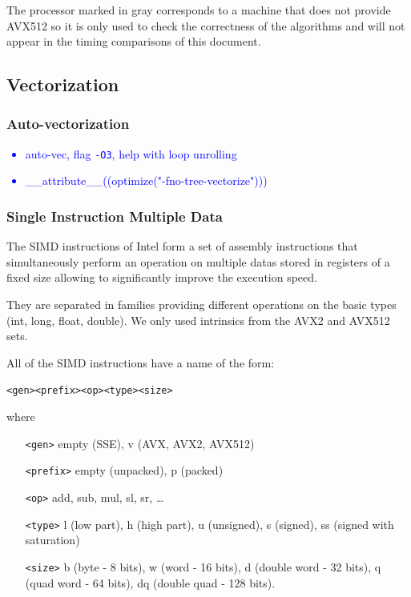 \documentclass[a4paper]{article}
\begin{document}
\bigskip
The processor marked in gray corresponds to a machine that does not provide AVX512 so it is only used to check the
correctness of the algorithms and will not appear in the timing comparisons of this document.

\subsection{Vectorization}

\subsubsection{Auto-vectorization}

\textcolor{blue}{
\begin{itemize}
    \item auto-vec, flag \texttt{-O3}, help with loop unrolling
    \item \_\_attribute\_\_((optimize("-fno-tree-vectorize")))
\end{itemize}}

\subsubsection{Single Instruction Multiple Data}

The SIMD instructions of Intel form a set of assembly instructions that simultaneously perform an operation on multiple datas stored in registers
of a fixed size allowing to significantly improve the execution speed.

They are separated in families providing different operations on the basic types (int, long, float, double). We only used intrinsics from
the AVX2 and AVX512 sets.

\bigskip
All of the SIMD instructions have a name of the form:
\begin{center} 
    \texttt{<gen><prefix><op><type><size>}
\end{center}

where
\begin{center}
    \begin{minipage}{12cm}
        \begin{itemize}
            \item[\texttt{<gen>}] empty (SSE), v (AVX, AVX2, AVX512)
            \item[\texttt{<prefix>}] empty (unpacked), p (packed)
            \item[\texttt{<op>}] add, sub, mul, sl, sr, \dots
            \item[\texttt{<type>}] l (low part), h (high part), u (unsigned), s (signed), ss (signed with saturation)
            \item[\texttt{<size>}] b (byte - 8 bits), w (word - 16 bits), d (double word - 32 bits), q (quad word - 64 bits), 
            dq (double quad - 128 bits).
        \end{itemize}
    \end{minipage}
\end{center}
\end{document}
